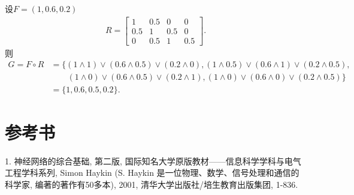 \begin{example}
设$F=(1, 0.6, 0.2)$
\begin{align}
  R=\left[
  \begin{array}{cccc}
  {1} & {0.5} & {0} & {0} \\
  {0.5} & {1} & {0.5} & {0} \\
  {0} & {0.5} & {1} & {0.5}
  \end{array}
  \right].
\end{align}
则
\begin{align*}
  G=F\circ R&=\{(1\wedge 1)\vee (0.6\wedge 0.5)\vee (0.2\wedge 0), (1\wedge 0.5)\vee (0.6\wedge 1)\vee (0.2\wedge 0.5),\\
            &\qquad  (1\wedge 0)\vee (0.6\wedge 0.5)\vee (0.2\wedge 1), (1\wedge 0)\vee (0.6\wedge 0)\vee (0.2\wedge 0.5)\}\\
            & =\{1, 0.6, 0.5, 0.2\}.
\end{align*}
\vspace{-0.4cm}
\end{example}
\section{参考书}

1. 神经网络的综合基础, 第二版,  国际知名大学原版教材——信息科学学科与电气工程学科系列, Simon Haykin (S. Haykin 是一位物理、数学、信号处理和通信的科学家, 编著的著作有50多本), 2001, 清华大学出版社/培生教育出版集团, 1-836.
